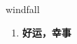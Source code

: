
\begin{frame}
{\huge windfall}
\begin{center}
\begin{enumerate}\Large
  \item \textbf{好运，幸事}
\end{enumerate}
\end{center}
\end{frame}
